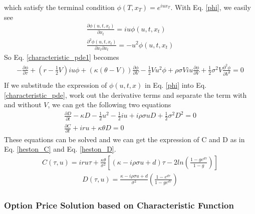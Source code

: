 \documentclass[a4paper]{article}
\begin{document}
which satisfy the terminal condition $\phi(T, x_T) = e^{iux_T}$. With Eq. \ref{phi}, we easily see
\begin{align*}
	\frac{\partial \phi(u, t, x_t)}{\partial x_t} = iu\phi(u, t, x_t) \\
	\frac{\partial^2 \phi(u, t, x_t)}{\partial x_t \partial x_t} = -u^2\phi(u, t, x_t)
\end{align*}
So Eq. \ref{characteristic_pde1} becomes
\begin{align*}	
	-\frac{\partial \phi}{\partial \tau}
	+ (r - \frac{1}{2}V)iu \phi 
	+ (\kappa(\theta-V)) \frac{\partial \phi}{\partial V}
        -\frac{1}{2}Vu^2 \phi
	+ \rho \sigma V iu \frac{\partial \phi}{\partial V}
	+\frac{1}{2} \sigma^2 V \frac{\partial^2 \phi}{\partial V^2}  = 0\\ \label{characteristic_pde}
\end{align*}
If we substitude the expression of $\phi(u, t, x)$ in Eq. \ref{phi} into Eq. \ref{characteristic_pde}, work out the derivative terms and separate the term with and without $V$, we can get the following two equations
\begin{align*}
	\frac{\partial D}{\partial t} - \kappa D - \frac{1}{2}u^2 -\frac{1}{2}iu + i\rho \sigma u D
	+\frac{1}{2} \sigma^2 D^2 = 0 \\
	\frac{\partial C}{\partial t} + iru + \kappa \theta D = 0
\end{align*}
These equations can be solved and we can get the expression of C and D as in Eq. \ref{heston_C} and Eq. \ref{heston_D}.
\begin{align*} 
	C(\tau, u) = iru\tau + \frac{\kappa \theta}{\sigma^2}
	[(\kappa - i\rho \sigma u + d)\tau - 2ln(\frac{1 - g e^{d\tau}}{1 - g})] 
\end{align*}
\begin{align*} 
	D(\tau, u) = \frac{\kappa - i\rho \sigma u + d}{\sigma^2} (\frac{1 - e^{d\tau}}{1-ge^{d\tau}})
\end{align*}
\subsubsection{Option Price Solution based on Characteristic Function}
\end{document}
